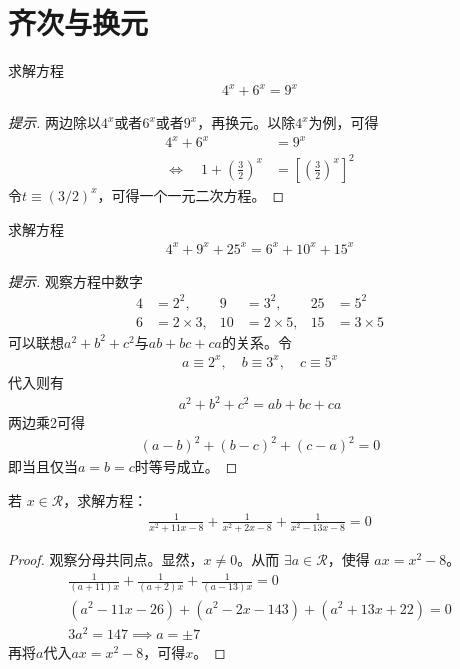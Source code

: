 \section{齐次与换元}
\label{sec:homogeneous-and-substitution}

\begin{example}[美国竞赛题]
  求解方程
  \begin{align*}
    4^x + 6^x = 9^x
  \end{align*}
\end{example}
\begin{proof}[提示]
  两边除以$4^x$或者$6^x$或者$9^x$，再换元。以除$4^x$为例，可得
  \begin{align*}
                               4^x + 6^x &= 9^x\\
    \iff\quad 1 + \left(\frac32\right)^x &= \left[\left(\frac32\right)^x\right]^2
  \end{align*}
  令$t\equiv (3/2)^x$，可得一个一元二次方程。
\end{proof}


\begin{example}[安徽竞赛题]
  求解方程
  \begin{align*}
    4^x + 9^x + 25^x = 6^x + 10^x + 15^x
  \end{align*}
\end{example}
\begin{proof}[提示]
  观察方程中数字
  \begin{align*}
    4 &= 2^2,       & 9 &= 3^2,        & 25 &= 5^2\\
    6 &= 2\times 3, & 10&= 2\times  5, & 15 &= 3\times 5
  \end{align*}
  可以联想$a^2+b^2+c^2$与$ab+bc+ca$的关系。令
  \begin{align*}
    a\equiv 2^x, \quad b\equiv 3^x, \quad c\equiv 5^x
  \end{align*}
  代入则有
  \begin{align*}
    a^2 + b^2 + c^2 = ab + bc + ca
  \end{align*}
  两边乘2可得
  \begin{align*}
    (a-b)^2 + (b-c)^2 + (c-a)^2 = 0
  \end{align*}
  即当且仅当$a=b=c$时等号成立。
\end{proof}



\begin{example}
  若 $x\in\mathcal{R}$，求解方程：
  \begin{align*}
    \frac1{x^2+11x-8} + \frac1{x^2+2x-8} + \frac1{x^2-13x-8} = 0
  \end{align*}
\end{example}
\begin{proof}
  观察分母共同点。显然，$x\ne 0$。从而 $\exists a\in\mathcal{R}$，使得 $ax = x^2-8$。
  \begin{align*}
    \frac1{(a+11)x} + \frac1{(a+2)x} + \frac1{(a-13)x} = 0\\
    (a^2-11x-26)+(a^2-2x-143)+(a^2+13x+22)=0\\
    3a^2=147\implies a=\pm7
  \end{align*}
  再将$a$代入$ax=x^2-8$，可得$x$。
\end{proof}



